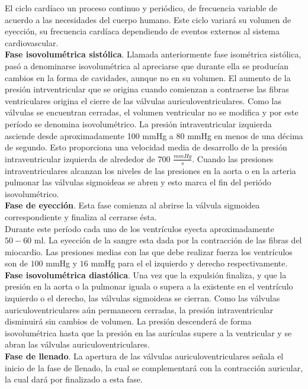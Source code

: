 El ciclo cardíaco un proceso continuo y periódico, de frecuencia variable de acuerdo a las necesidades del cuerpo
humano. Este ciclo variará su volumen de eyección, su frecuencia cardíaca dependiendo de eventos externos al sistema
cardiovascular. \\
\indent \textbf{Fase isovolumétrica sistólica}. Llamada anteriormente fase isométrica sistólica, pasó
a denominarse isovolumétrica al apreciarse que durante ella se producían cambios en la forma de cavidades, aunque no
en su volumen. El aumento de la presión intrventricular que se origina cuando comienzan a contraerse las fibras
ventriculares origina el cierre de las válvulas auriculoventriculares. Como las válvulas se encuentran cerradas, el
volumen ventricular no se modifica y por este período se denomina isovolumétrico. La presión intraventricular izquierda
asciende desde aproximadamente 100 mmHg a 80 mmHg en menos de una décima de segundo. Esto proporciona una velocidad
media de desarrollo de la presión intraventricular izquierda de alrededor de 700 $\frac{mmHg}{s}$. Cuando las
presiones intraventriculares alcanzan los niveles de las presiones en la aorta o en la arteria pulmonar las válvulas
sigmoideas se abren y esto marca el fin del periódo isovolumétrico. \\
\indent \textbf{Fase de eyección}. Esta fase comienza al abrirse la válvula sigmoidea correspondiente y finaliza al
cerrarse ésta. \\
\indent Durante este período cada uno de los ventrículos eyecta aproximadamente $50-60$ ml. La eyección de la sangre
esta dada por la contracción de las fibras del miocardio. Las presiones medias con las que debe realizar fuerza los
ventrículos son de $100$ mmHg y $16$ mmHg para el el izquierdo y derecho respectivamente. \\
\indent \textbf{Fase isovolumétrica diastólica}. Una vez que la expulsión finaliza, y que la presión en la aorta o
la pulmonar iguala o supera a la existente en el ventrículo izquierdo o el derecho, las válvulas sigmoideas se
cierran. Como las válvulas auriculoventriculares aún permanecen cerradas, la presión intraventricular disminuirá sin
cambios de volumen. La presión descenderá de forma isovolumétrica hasta que la presión en las aurículas supere a la
ventricular y se abran las válvulas auriculoventriculares. \\
\indent \textbf{Fase de llenado}. La apertura de las válvulas auriculoventriculares señala el inicio de la fase de
llenado, la cual se complementará con la contracción auricular, la cual dará por finalizado a esta fase.
    
